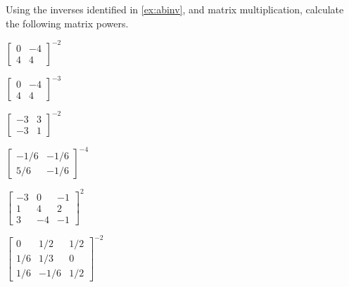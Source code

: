 \begin{exercise} \label{ex:} 
Using the inverses identified in \autoref{ex:abinv}, and matrix multiplication, calculate the following matrix powers.
\begin{parts}
\item \(\begin{bmatrix} 0&-4\\4&4 \end{bmatrix}^{-2}\)

\item \(\begin{bmatrix} 0&-4\\4&4 \end{bmatrix}^{-3}\)

\item \(\begin{bmatrix} -3&3
\\-3&1 \end{bmatrix}^{-2}\)

\item \(\begin{bmatrix} -1/6&-1/6
\\5/6&-1/6 \end{bmatrix}^{-4}\)

\item \(\begin{bmatrix} -3&0&-1
\\1&4&2
\\3&-4&-1 \end{bmatrix}^2\)

\item \(\begin{bmatrix} 0&1/2&1/2
\\1/6&1/3&0
\\1/6&-1/6&1/2 \end{bmatrix}^{-2}\)


\end{parts}
\end{exercise}
